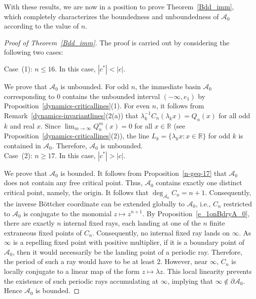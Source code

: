 \documentclass[12pt]{article}
\begin{document}
 With these results, we are now in a position to prove Theorem~\ref{Bdd_imm}, which completely characterizes the boundedness and unboundedness of $\mathcal{A}_{0}$ according to the value of $n$.
 


\begin{proof}[Proof of Theorem~\ref{Bdd_imm}]
	The proof is carried out by considering the following two cases:
	
	\noindent
	Case~(1): $n\leq 16$. In this case, $|c^*|<|c|$.
	
	We prove that $\mathcal{A}_0$ is unbounded. For odd $n$, the immediate basin $\mathcal{A}_0$ corresponding to $0$ contains the unbounded interval $(-\infty,e_1)$ by Proposition~\ref{dynamics-criticallines}(1).
    For even $n$,  it follows from Remark~\ref{dynamics-invariantlines}(2(a)) that $\lambda_k ^{-1}C_n (\lambda_k x) =Q_n (x)$ for all odd $k$ and real $x$. Since $ \lim_{m \to \infty} Q_n ^m (x)= 0$ for all 
    $x \in \mathbb{R}$ (see Proposition~\ref{dynamics-criticallines}(2)), the line $L_k = \{\lambda_k x: x \in \mathbb{R}\}$ for odd $k$ is contained in $\mathcal{A}_0$. Therefore, $\mathcal{A}_0$ is unbounded. \\

	\noindent
	Case~(2): $n\geq 17$. In this case, $|c^*|>|c|$.
	
	We prove that $\mathcal{A}_0$ is bounded. It follows from Proposition~\ref{n-geq-17} that $\mathcal{A}_0$ does not contain any free critical point. Thus, $\mathcal{A}_0$ contains exactly one distinct critical point, namely, the origin. It follows that $\deg_{\mathcal{A}_0} C_{n} = n+1$. Consequently, the inverse Böttcher coordinate can be extended globally to $\mathcal{A}_0$, i.e., $C_{n}$ restricted to $\mathcal{A}_0$ is conjugate to the monomial $z \mapsto z^{n+1}$. By Proposition~\ref{e_1onBdryA_0}, there are exactly $n$ internal fixed rays, each landing at one of the $n$ finite extraneous fixed points of $C_n$.  Consequently, no internal fixed ray lands on $\infty$. As $\infty$ is a repelling fixed point with positive multiplier, if it is a boundary point of $\mathcal{A}_0$, then it would necessarily be the landing point of a periodic ray. Therefore, the period of such a ray would have to be at least $2$. However, near $\infty$, $C_{n}$ is locally conjugate to a linear map of the form $z \mapsto \lambda z$.  This local linearity prevents the existence of such periodic rays accumulating at $\infty$, implying that $\infty \notin \partial \mathcal{A}_0$. Hence $\mathcal{A}_0$ is bounded.
\end{proof}
\end{document}
